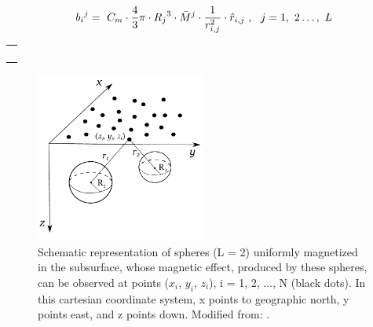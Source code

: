 \documentclass[manuscript,revised]{geophysics}
\begin{document}

\begin{equation} \label{eq:sphere2}
\centering
{b_i}^j=\ C_m \cdot \frac{4}{3}\pi \cdot {R_j}^3 \cdot {\bar{M}}^j\cdot\frac{1}{r_{i,j}^2}\cdot{\hat{r}}_{i,j}\ ,\ \ j=1,\ 2\ldots,\ L
\end{equation}

\begin{tabular}{ l }
\noindent{Where: $C_m=\ \frac{\mu_0}{4\pi}=\ {10}^{-7}\frac{\ H}{m}$; $R_j$ is the radius of the j-th sphere; $r_{i,j}$ is the distance}   \\ 
\noindent{(unit vector ${\hat{r}}_{i,j}$) between the center of the j-th sphere and the observation point i,}    \\  
\noindent{i = 1, 2, . .. N; and ${\bar{M}}^j=\left[{Mx}_j\ {My}_j\ {Mz}_j\right]^T$ is the vector formed by the cartesian} \\
\noindent{components of the magnetization of the j-th sphere (unit vector ${\hat{M}}^j)$.}
\end{tabular}

\bigskip

\begin{figure}[htbp]
\centering
\includegraphics[width=0.5\textwidth]{MODEL.pdf}
\caption{Schematic representation of spheres (L = 2) uniformly magnetized in the subsurface, whose magnetic effect, produced by these spheres, can be observed at points ($x_i$, $ y_i$, $z_i$), i = 1, 2, ..., N (black dots). In this cartesian coordinate system, x points to geographic north, y points east, and z points down. Modified from: \cite{OliveiraJr.2015}.}
\label{fig:MODEL}
\end{figure}
\end{document}

